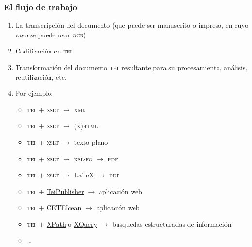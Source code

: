 \documentclass[%
  handout, %
  xcolor=svgnames]{beamer}
\newcommand*{\TEI}{\textsc{tei}}
\newcommand*{\XML}{\textsc{xml}}
\begin{document}
\begin{frame}
  \frametitle{El flujo de trabajo}
  \begin{enumerate}
    \item La transcripción del documento (que puede ser manuscrito o impreso, en cuyo caso se puede usar \textsc{ocr})
    \item Codificación en \TEI
    \item Transformación del documento \TEI\ resultante para su procesamiento, análisis, reutilización, etc. 
    \item[] Por ejemplo:
      \begin{itemize}
        \item \TEI\ $+$ \href{https://www.w3.org/TR/xslt/}{\textsc{xslt}} $\rightarrow$ \XML
        \item \TEI\ $+$ \textsc{xslt} $\rightarrow$ \textsc{(x)html}
        \item \TEI\ $+$ \textsc{xslt} $\rightarrow$ texto plano
        \item \TEI\ $+$ \textsc{xslt} $\rightarrow$ \href{https://www.w3.org/TR/xsl11/\#fo-section}{\textsc{xsl-fo}}  $\rightarrow$ \textsc{pdf}
        \item \TEI\ $+$ \textsc{xslt} $\rightarrow$ \href{https://www.latex-project.org/}{\LaTeX}  $\rightarrow$ \textsc{pdf}
        \item \TEI\ $+$ \href{https://teipublisher.com}{TeiPublisher} $\rightarrow$ aplicación web
        \item \TEI\ $+$ \href{https://github.com/TEIC/CETEIcean}{CETEIcean} $\rightarrow$ aplicación web
        \item \TEI\ $+$ \href{https://www.w3.org/TR/xpath-31/}{XPath} o \href{http://www.w3.org/XML/Query/}{XQuery} $\rightarrow$ búsquedas estructuradas de información 
        \item \dots
      \end{itemize}
  \end{enumerate}
\end{frame}

\end{document}
